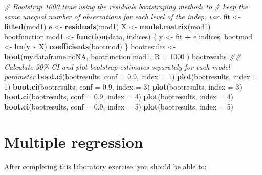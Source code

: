 \documentclass[
  12pt,
]{book}
\newenvironment{Shaded}{\begin{snugshade}}{\end{snugshade}}
\newcommand{\CommentTok}[1]{\textcolor[rgb]{0.56,0.35,0.01}{\textit{#1}}}
\newcommand{\ControlFlowTok}[1]{\textcolor[rgb]{0.13,0.29,0.53}{\textbf{#1}}}
\newcommand{\DataTypeTok}[1]{\textcolor[rgb]{0.13,0.29,0.53}{#1}}
\newcommand{\DecValTok}[1]{\textcolor[rgb]{0.00,0.00,0.81}{#1}}
\newcommand{\FloatTok}[1]{\textcolor[rgb]{0.00,0.00,0.81}{#1}}
\newcommand{\KeywordTok}[1]{\textcolor[rgb]{0.13,0.29,0.53}{\textbf{#1}}}
\newcommand{\NormalTok}[1]{#1}
\newcommand{\OperatorTok}[1]{\textcolor[rgb]{0.81,0.36,0.00}{\textbf{#1}}}
\newcommand{\StringTok}[1]{\textcolor[rgb]{0.31,0.60,0.02}{#1}}
\begin{document}
\begin{Shaded}
\begin{Highlighting}[]
\CommentTok{\# Bootstrap 1000 time using the residuals bootstraping methods to}
\CommentTok{\# keep the same unequal number of observations for each level of the indep. var.}
\NormalTok{fit \textless{}{-}}\StringTok{ }\KeywordTok{fitted}\NormalTok{(mod1)}
\NormalTok{e \textless{}{-}}\StringTok{ }\KeywordTok{residuals}\NormalTok{(mod1)}
\NormalTok{X \textless{}{-}}\StringTok{ }\KeywordTok{model.matrix}\NormalTok{(mod1)}
\NormalTok{bootfunction.mod1 \textless{}{-}}\StringTok{ }\ControlFlowTok{function}\NormalTok{(data, indices) \{}
\NormalTok{  y \textless{}{-}}\StringTok{ }\NormalTok{fit }\OperatorTok{+}\StringTok{ }\NormalTok{e[indices]}
\NormalTok{  bootmod \textless{}{-}}\StringTok{ }\KeywordTok{lm}\NormalTok{(y }\OperatorTok{\textasciitilde{}}\StringTok{ }\NormalTok{X)}
  \KeywordTok{coefficients}\NormalTok{(bootmod)}
\NormalTok{\}}
\NormalTok{bootresults \textless{}{-}}\StringTok{ }\KeywordTok{boot}\NormalTok{(my.dataframe.noNA, bootfunction.mod1,}
  \DataTypeTok{R =} \DecValTok{1000}
\NormalTok{)}
\NormalTok{bootresults}
\CommentTok{\#\# Calculate 90\% CI and plot bootstrap estimates separately for each model parameter}
\KeywordTok{boot.ci}\NormalTok{(bootresults, }\DataTypeTok{conf =} \FloatTok{0.9}\NormalTok{, }\DataTypeTok{index =} \DecValTok{1}\NormalTok{)}
\KeywordTok{plot}\NormalTok{(bootresults, }\DataTypeTok{index =} \DecValTok{1}\NormalTok{)}
\KeywordTok{boot.ci}\NormalTok{(bootresults, }\DataTypeTok{conf =} \FloatTok{0.9}\NormalTok{, }\DataTypeTok{index =} \DecValTok{3}\NormalTok{)}
\KeywordTok{plot}\NormalTok{(bootresults, }\DataTypeTok{index =} \DecValTok{3}\NormalTok{)}
\KeywordTok{boot.ci}\NormalTok{(bootresults, }\DataTypeTok{conf =} \FloatTok{0.9}\NormalTok{, }\DataTypeTok{index =} \DecValTok{4}\NormalTok{)}
\KeywordTok{plot}\NormalTok{(bootresults, }\DataTypeTok{index =} \DecValTok{4}\NormalTok{)}
\KeywordTok{boot.ci}\NormalTok{(bootresults, }\DataTypeTok{conf =} \FloatTok{0.9}\NormalTok{, }\DataTypeTok{index =} \DecValTok{5}\NormalTok{)}
\KeywordTok{plot}\NormalTok{(bootresults, }\DataTypeTok{index =} \DecValTok{5}\NormalTok{)}
\end{Highlighting}
\end{Shaded}

\hypertarget{multiple-regression}{%
\chapter{Multiple regression}\label{multiple-regression}}

After completing this laboratory exercise, you should be able to:
\end{document}
